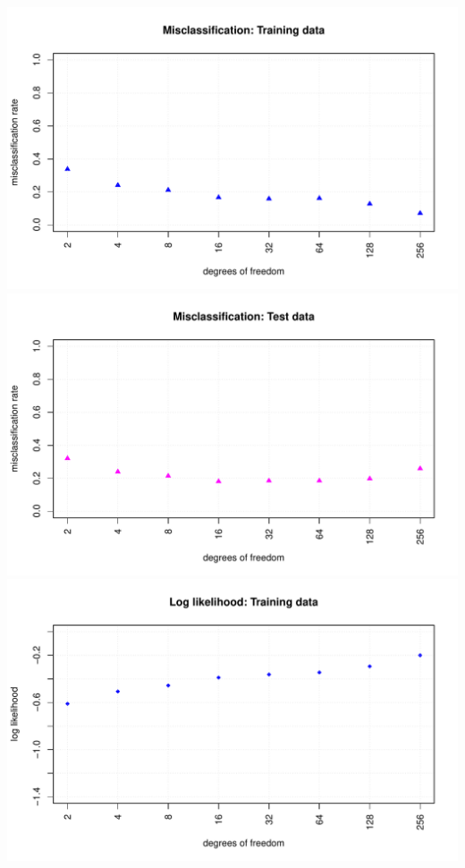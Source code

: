 \documentclass[
]{article}
\begin{document}
\includegraphics{A2_files/figure-latex/unnamed-chunk-33-1.pdf}
\includegraphics{A2_files/figure-latex/unnamed-chunk-33-2.pdf}
\includegraphics{A2_files/figure-latex/unnamed-chunk-33-3.pdf}
\end{document}
